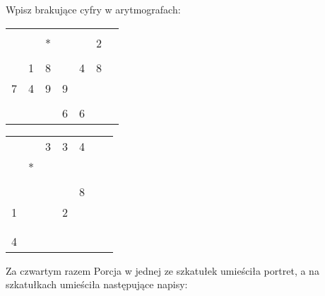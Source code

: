 \documentclass[a4paper,12pt]{article}
\newcommand\<
      {%
        \raise 0.2ex\hbox{%
                          $< \kern-1.85ex \raise 0.09ex\hbox{$\scriptstyle )$}$%
                         }\kern 0.6ex
      }
\newcommand{\Ramka}
{
\fbox{\hspace*{3mm}\rule{0mm}{5mm}}
}
\begin{document}
 Wpisz brakujące cyfry w  arytmografach:\\
\begin{minipage}{65mm}
 \Large
 \begin{tabular}{ccccccc}
        &        & \Ramka & \Ramka & \Ramka & \Ramka  \\       %
        &        &    *   &        & \Ramka &    2    \\       %
 \cline{2-6}                                          \\[-6mm] %
        &    1   &    8   & \Ramka &    4   &    8    \\       %
    7   &    4   &    9   &    9   & \Ramka           \\       %
 \cline{1-6}                                          \\[-6mm] %
 \Ramka & \Ramka & \Ramka &    6   &    6   & \Ramka           %
 \end{tabular}
\end{minipage}
\hspace{10mm}
\begin{minipage}{65mm}
 \Large
 \begin{tabular}{ccccccc}
        &        &    3   &    3   &    4     \\                 %
        &    *   & \Ramka & \Ramka & \Ramka   \\                 %
 \cline{2-5}                                  \\[-6mm]           %
        &        & \Ramka & \Ramka &    8     \\                 %
    1   & \Ramka & \Ramka &    2              \\                 %
 \Ramka & \Ramka & \Ramka                     \\                 %
 \cline{1-5}                                  \\[-6mm]           %
    4   & \Ramka & \Ramka & \Ramka & \Ramka                      %
 \end{tabular}
\end{minipage}



 Za czwartym  razem  Porcja w jednej ze szkatułek umieściła portret, a na szkatułkach umieściła
      następujące napisy:
\end{document}
